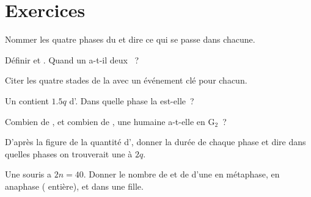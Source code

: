 \section{Exercices}

\begin{exercise}[$\star$]\label{exo:g11:cell-cycle-mitosis:1}
Nommer les quatre phases du  et dire ce qui se passe
dans chacune.
\end{exercise}

\begin{exercise}[$\star$]\label{exo:g11:cell-cycle-mitosis:2}
Définir  et . Quand un  a-t-il deux
~?
\end{exercise}

\begin{exercise}[$\star$]\label{exo:g11:cell-cycle-mitosis:3}
Citer les quatre stades de la  avec un événement clé pour chacun.
\end{exercise}

\begin{exercise}[$\star$]\label{exo:g11:cell-cycle-mitosis:4}
Un  contient $1.5q$ d'. Dans quelle phase la  est-elle~?
\end{exercise}

\begin{exercise}[$\star$]\label{exo:g11:cell-cycle-mitosis:5}
Combien de , et combien de , une  humaine
a-t-elle en $\mathrm{G_2}$~?
\end{exercise}

\begin{exercise}[$\star\star$]\label{exo:g11:cell-cycle-mitosis:6}
D'après la figure de la quantité d', donner la durée de chaque phase
et dire dans quelles phases on trouverait une  à $2q$.
\end{exercise}

\begin{exercise}[$\star\star$]\label{exo:g11:cell-cycle-mitosis:7}
Une souris a $2n = 40$. Donner le nombre de  et de
 d'une  en métaphase, en anaphase ( entière),
et dans une  fille.
\end{exercise}

